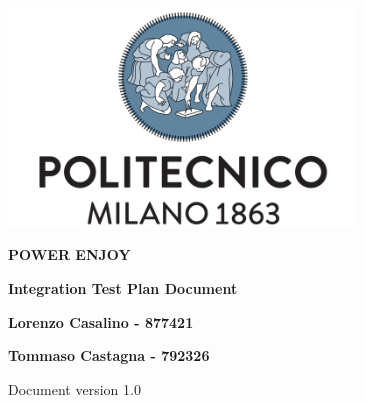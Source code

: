 \begin{titlepage}
        \begin{center}
                \includegraphics[width=350px]{../Datas/images/polimi.png}

                \vspace*{2.0cm}

                {\Huge \textbf{POWER ENJOY}\par}

                \vspace*{1.0cm}

                {\LARGE \textbf{Integration Test Plan Document}\par}

                \vspace*{2.0cm}

                {\normalsize
                \textbf{Lorenzo Casalino - 877421}\par
                \textbf{Tommaso Castagna - 792326}\par
                }

                \vfill
                Document version 1.0
        \end{center}
\end{titlepage}
